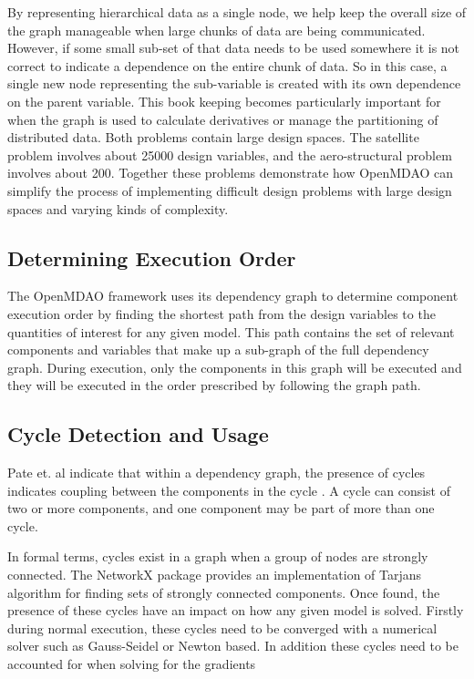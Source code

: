 \documentclass[]{aiaa-tc} %
\begin{document}
    By representing hierarchical data as a single node, we help keep the overall size of the graph manageable
    when large chunks of data are being communicated. However, if some small sub-set of that data needs to be
    used somewhere it is not correct to indicate a dependence on the entire chunk of data. So in this case, a
    single new node representing the sub-variable is created with its own dependence on the parent variable.
    This book keeping becomes particularly important for when the graph is used to calculate derivatives or
    manage the partitioning of distributed data. Both problems contain large design spaces. The satellite problem
    involves about 25000 design variables, and the aero-structural problem involves about 200.
    Together these problems demonstrate how OpenMDAO can simplify the process of implementing difficult
    design problems with large design spaces and varying kinds of complexity.


    \subsection{Determining Execution Order}

    The OpenMDAO framework uses its dependency graph to determine component execution order by finding the
    shortest path from the design variables to the quantities of interest for any given model\cite{openmdao_derivatives}.
    This path contains the set of relevant components and variables that make up a sub-graph of the full
    dependency graph. During execution, only the components in this graph will be executed and they will be executed
    in the order prescribed by following the graph path.

    \subsection{Cycle Detection and Usage}
    Pate et. al indicate that within a dependency graph, the presence of cycles indicates coupling between
    the components in the cycle \cite{graph_problem2013}. A cycle can consist of two or more components, and
    one component may be part of more than one cycle.

    In formal terms, cycles exist in a graph when a group of nodes are strongly connected. The NetworkX package
    provides an implementation of Tarjans algorithm for finding sets of strongly connected
    components\cite{tarjan1972depth,nuutila1994finding}. Once found, the presence of these cycles
    have an impact on how any given model is solved. Firstly during normal execution, these cycles
    need to be converged with a numerical solver such as Gauss-Seidel or Newton based.
    In addition these cycles need to be accounted for when solving for the gradients
\end{document}
